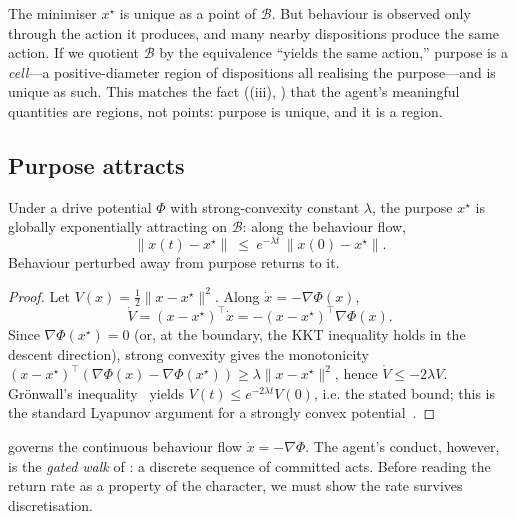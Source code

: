\documentclass[11pt,twocolumn,a4paper]{article}
\newcommand{\Beh}{\mathcal{B}}       %
\newcommand{\norm}[1]{\lVert#1\rVert}
\begin{document}
\begin{remark}
\label{rem:equiv}
The minimiser $x^\star$ is unique as a point of $\Beh$. But behaviour is
observed only through the action it produces, and many nearby dispositions
produce the same action. If we quotient $\Beh$ by the equivalence ``yields
the same action,'' purpose is a \emph{cell}---a positive-diameter region
of dispositions all realising the purpose---and is unique as such. This
matches the fact ((iii), ) that
the agent's meaningful quantities are regions, not points: purpose is
unique, and it is a region.
\end{remark}

\subsection{Purpose attracts}

\begin{theorem}
\label{thm:attractor}
Under a drive potential $\Phi$ with strong-convexity constant $\lambda$,
the purpose $x^\star$ is globally exponentially attracting on $\Beh$:
along the behaviour flow,
\[
\norm{x(t)-x^\star}\ \le\ e^{-\lambda t}\,\norm{x(0)-x^\star}.
\]
Behaviour perturbed away from purpose returns to it.
\end{theorem}

\begin{proof}
Let $V(x)=\tfrac12\norm{x-x^\star}^2$. Along $\dot x=-\nabla\Phi(x)$,
\[
\dot V=(x-x^\star)^\top\dot x=-(x-x^\star)^\top\nabla\Phi(x).
\]
Since $\nabla\Phi(x^\star)=0$ (or, at the boundary, the KKT inequality
holds in the descent direction), strong convexity gives the monotonicity
$(x-x^\star)^\top(\nabla\Phi(x)-\nabla\Phi(x^\star))\ge\lambda\norm{x-
x^\star}^2$, hence $\dot V\le-2\lambda V$. Grönwall's inequality~\cite{%
khalil2002} yields $V(t)\le e^{-2\lambda t}V(0)$, i.e. the stated bound;
this is the standard Lyapunov argument for a strongly convex
potential~\cite{hirschsmaledevaney2013}.
\end{proof}

 governs the continuous behaviour flow $\dot
x=-\nabla\Phi$. The agent's conduct, however, is the \emph{gated walk} of
: a discrete sequence of committed acts. Before reading
the return rate as a property of the character, we must show the rate
survives discretisation.
\end{document}
